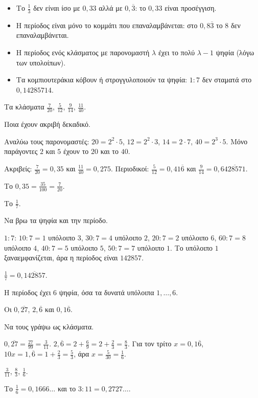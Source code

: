 \begin{prosoxi}
\begin{itemize}[leftmargin=1.2em,itemsep=0.3ex,topsep=2pt]
\item Το $\frac{1}{3}$ δεν είναι ίσο με $0{,}33$ αλλά με $0{,}\overline{3}$: το $0{,}33$ είναι προσέγγιση.
\item Η περίοδος είναι μόνο το κομμάτι που επαναλαμβάνεται: στο $0{,}8\overline{3}$ το $8$ δεν επαναλαμβάνεται.
\item Η περίοδος ενός κλάσματος με παρονομαστή $\lambda$ έχει το πολύ $\lambda-1$ ψηφία (λόγω των υπολοίπων).
\item Τα κομπιουτεράκια κόβουν ή στρογγυλοποιούν τα ψηφία: $1:7$ δεν σταματά στο $0{,}14285714$.
\end{itemize}
\end{prosoxi}


\tixero Τα κλάσματα $\frac{7}{20}$, $\frac{5}{12}$, $\frac{9}{14}$, $\frac{11}{40}$.\par
\tithelo Ποια έχουν ακριβή δεκαδικό.\par
\possindeo Αναλύω τους παρονομαστές: $20=2^2\cdot5$, $12=2^2\cdot3$, $14=2\cdot7$, $40=2^3\cdot5$. Μόνο παράγοντες $2$ και $5$ έχουν το $20$ και το $40$.\par
\apantisi Ακριβείς: $\frac{7}{20}=0{,}35$ και $\frac{11}{40}=0{,}275$. Περιοδικοί: $\frac{5}{12}=0{,}41\overline{6}$ και $\frac{9}{14}=0{,}6\overline{428571}$.\par
\elegxos Το $0{,}35=\frac{35}{100}=\frac{7}{20}$.

\tixero Το $\frac{1}{7}$.\par
\tithelo Να βρω τα ψηφία και την περίοδο.\par
\possindeo $1:7$: $10:7=1$ υπόλοιπο $3$, $30:7=4$ υπόλοιπο $2$, $20:7=2$ υπόλοιπο $6$, $60:7=8$ υπόλοιπο $4$, $40:7=5$ υπόλοιπο $5$, $50:7=7$ υπόλοιπο $1$. Το υπόλοιπο $1$ ξαναεμφανίζεται, άρα η περίοδος είναι $142857$.\par
\apantisi $\frac{1}{7}=0{,}\overline{142857}$.\par
\elegxos Η περίοδος έχει $6$ ψηφία, όσα τα δυνατά υπόλοιπα $1,\dots,6$.

\tixero Οι $0{,}\overline{27}$, $2{,}\overline{6}$ και $0{,}1\overline{6}$.\par
\tithelo Να τους γράψω ως κλάσματα.\par
\possindeo $0{,}\overline{27}=\frac{27}{99}=\frac{3}{11}$. $2{,}\overline{6}=2+\frac{6}{9}=2+\frac{2}{3}=\frac{8}{3}$. Για τον τρίτο $x=0{,}1\overline{6}$, $10x=1{,}\overline{6}=1+\frac{2}{3}=\frac{5}{3}$, άρα $x=\frac{5}{30}=\frac{1}{6}$.\par
\apantisi $\frac{3}{11}$, $\frac{8}{3}$, $\frac{1}{6}$.\par
\elegxos Το $\frac{1}{6}=0{,}1666\ldots$ και το $3:11=0{,}2727\ldots$.

